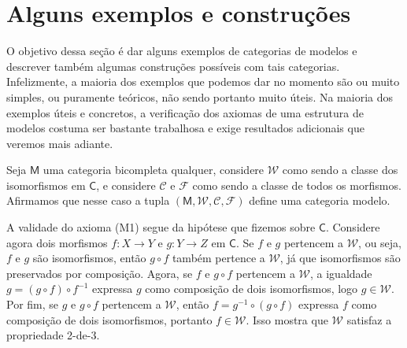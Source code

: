 \section{Alguns exemplos e construções}

O objetivo dessa seção é dar alguns exemplos de categorias de modelos e descrever também algumas construções possíveis com tais categorias.
Infelizmente, a maioria dos exemplos que podemos dar no momento são ou muito simples, ou puramente teóricos, não sendo portanto muito úteis.
Na maioria dos exemplos úteis e concretos, a verificação dos axiomas de uma estrutura de modelos costuma ser bastante trabalhosa e exige resultados adicionais que veremos mais adiante.

\begin{exem}
  Seja $\mathsf{M}$ uma categoria bicompleta qualquer, considere $\mathcal{W}$ como sendo a classe dos isomorfismos em $\mathsf{C}$, e considere $\mathcal{C}$ e $\mathcal{F}$ como sendo a classe de todos os morfismos.
  Afirmamos que nesse caso a tupla $(\mathsf{M},\mathcal{W},\mathcal{C},\mathcal{F})$ define uma categoria modelo.

  A validade do axioma (M1) segue da hipótese que fizemos sobre $\mathsf{C}$.
  Considere agora dois morfismos $f: X \to Y$ e $g: Y \to Z$ em $\mathsf{C}$.
  Se $f$ e $g$ pertencem a $\mathcal{W}$, ou seja, $f$ e $g$ são isomorfismos, então $g \circ f$ também pertence a $\mathcal{W}$, já que isomorfismos são preservados por composição.
  Agora, se $f$ e $g \circ f$ pertencem a $\mathcal{W}$, a igualdade $g = (g \circ f) \circ f^{-1}$ expressa $g$ como composição de dois isomorfismos, logo $g \in \mathcal{W}$.
  Por fim, se $g$ e $g \circ f$ pertencem a $\mathcal{W}$, então $f = g^{-1} \circ (g \circ f)$ expressa $f$ como composição de dois isomorfismos, portanto $f \in \mathcal{W}$.
  Isso mostra que $\mathcal{W}$ satisfaz a propriedade 2-de-3.


\end{exem}
